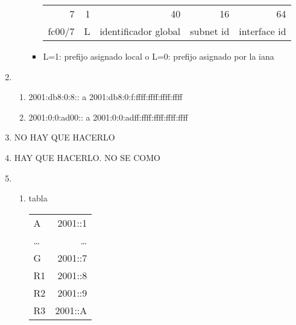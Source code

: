 \documentclass[11pt]{article}
\begin{document}
\begin{enumerate}
\begin{itemize}
\begin{itemize}
\begin{center}
\begin{tabular}{rrrrr}
7 & 1 & 40 & 16 & 64\\
fc00/7 & L & identificador global & subnet id & interface id\\
\end{tabular}
\end{center}
\item L=1: prefijo asignado local o L=0: prefijo asignado por la iana
\end{itemize}
\end{itemize}
\item \begin{enumerate}
\item 2001:db8:0:8:: a 2001:db8:0:f:ffff:ffff:ffff:ffff
\item 2001:0:0:ad00:: a 2001:0:0:adff:ffff:ffff:ffff:ffff
\end{enumerate}
\item NO HAY QUE HACERLO
\item HAY QUE HACERLO. NO SE COMO
\item \begin{enumerate}
\item tabla
\begin{center}
\begin{tabular}{lr}
A & 2001::1\\
\ldots{} & \ldots{}\\
G & 2001::7\\
R1 & 2001::8\\
R2 & 2001::9\\
R3 & 2001::A\\
\end{tabular}
\end{center}
\end{enumerate}
\end{enumerate}
\end{document}

